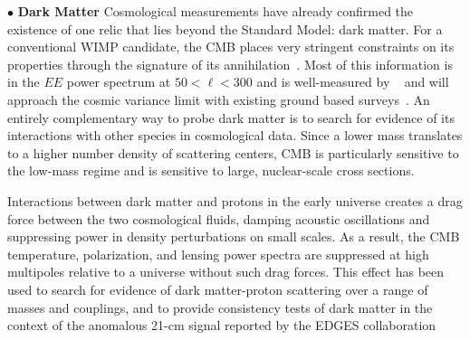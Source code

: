 \documentclass[PICOReport.tex]{subfiles}
\begin{document}

$\bullet$ {\bf Dark Matter} \hspace{0.1in} Cosmological measurements have already confirmed the existence of one relic that lies beyond the Standard Model: dark matter. For a conventional WIMP candidate, the CMB places very stringent constraints on its properties through the signature of its annihilation~\cite{Peebles:2000pn, Chen:2003gz, Padmanabhan:2005es}. Most of this information is in the $EE$ power spectrum at $50 < \ell < 300$ and is well-measured by \planck~ and will approach the cosmic variance limit with existing ground based surveys~\cite{Madhavacheril:2013cna,Green:2018pmd}.  An entirely complementary way to probe dark matter is to search for evidence of its interactions with other species in cosmological data. Since a lower mass translates to a higher number density of scattering centers, CMB is particularly sensitive to the low-mass regime and is sensitive to large, nuclear-scale cross sections. 
 
Interactions between dark matter and protons in the early universe creates a drag force between the two cosmological fluids, damping acoustic oscillations and suppressing power in density perturbations on small scales. As a result, the CMB temperature, polarization, and lensing power spectra are suppressed at high multipoles relative to a universe without such drag forces.  This effect has been used to search for evidence of dark matter-proton scattering over a range of masses and couplings, and to provide consistency tests of dark matter in the context of the anomalous 21-cm signal reported by the EDGES collaboration~\citep{2002astro.ph..2496C,2004PhRvD..70h3501S,Dvorkin:2013cea,2018PhRvL.121h1301G,2018arXiv180108609B,2018PhRvD..97j3530X,2018arXiv180800001B, 2018PhRvD..98b3013S,2018Natur.555...67B}

\end{document}
